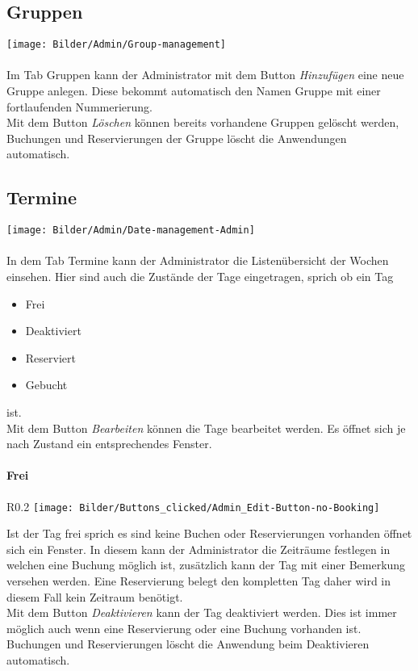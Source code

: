 \subsection{Gruppen}
	\texttt{[image: Bilder/Admin/Group-management]}
	\\
	\\	
Im Tab Gruppen kann der Administrator mit dem Button \textit{Hinzufügen} eine neue Gruppe anlegen. Diese bekommt automatisch den Namen Gruppe mit einer fortlaufenden Nummerierung.\\Mit dem Button \textit{Löschen} können bereits vorhandene Gruppen gelöscht werden, Buchungen und Reservierungen der Gruppe löscht die Anwendungen automatisch.

\subsection{Termine}
	\texttt{[image: Bilder/Admin/Date-management-Admin]}
	\\
	\\
In dem Tab Termine kann der Administrator die Listenübersicht der Wochen einsehen. Hier sind auch die Zustände der Tage eingetragen, sprich ob ein Tag
\begin{itemize}
	\item Frei 
	\item Deaktiviert 
	\item Reserviert 
	\item Gebucht
\end{itemize}
ist.
\\ Mit dem Button \textit{Bearbeiten} können die Tage bearbeitet werden. Es öffnet sich je nach Zustand ein entsprechendes Fenster.


\paragraph{Frei}
\begin{wrapfigure}{R}{0.2\textwidth}
	\centering
	\texttt{[image: Bilder/Buttons\_clicked/Admin\_Edit-Button-no-Booking]}
\end{wrapfigure}
Ist der Tag frei sprich es sind keine Buchen oder Reservierungen vorhanden öffnet sich ein Fenster. In diesem kann der Administrator die Zeiträume festlegen in welchen eine Buchung möglich ist, zusätzlich kann der Tag mit einer Bemerkung versehen werden. Eine Reservierung belegt den kompletten Tag daher wird in diesem Fall kein Zeitraum benötigt. 
\\Mit dem Button \textit{Deaktivieren} kann der Tag deaktiviert werden. Dies ist immer möglich auch wenn eine Reservierung oder eine Buchung vorhanden ist. Buchungen und Reservierungen löscht die Anwendung beim Deaktivieren automatisch.


